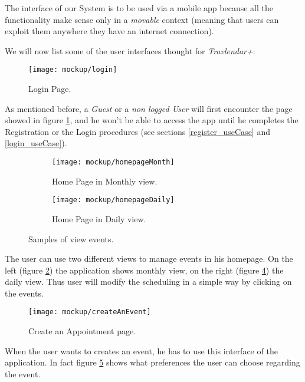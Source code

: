 The interface of our System is to be used via a mobile app because all the functionality make sense only in a \textit{movable} context (meaning that users can exploit them anywhere they have an internet connection).

We will now list some of the user interfaces thought for \textit{Travlendar+}:

\begin{figure}[h]
	\texttt{[image: mockup/login]}
	\centering
	\caption{Login Page.}
	\label{fig:login}
\end{figure}
As mentioned before, a \textit{Guest} or a \textit{non logged User} will first encounter the page showed in figure \ref{fig:login}, and he won't be able to access the app until he completes the Registration or the Login procedures (see sections \ref{register_useCase} and \ref{login_useCase}).

\begin{figure}[H]
	\begin{subfigure}{0.5\textwidth}
		\texttt{[image: mockup/homepageMonth]} 
		\centering
		\caption{Home Page in Monthly view.}
		\label{fig:homePage_Month}
	\end{subfigure}
	\begin{subfigure}{0.5\textwidth}
		\texttt{[image: mockup/homepageDaily]} 
		\centering
		\caption{Home Page in Daily view.}
		\label{fig:homePage_Day}
	\end{subfigure}
	\caption{Samples of view events.}
\end{figure}

The user can use two different views to manage events in his homepage. On the left (figure \ref{fig:homePage_Month}) the application shows monthly view, on the right (figure \ref{fig:homePage_Day}) the daily view. Thus user will modify the scheduling in a simple way by clicking on the events.

\begin{figure}[H]
	\texttt{[image: mockup/createAnEvent]}
	\centering
	\caption{Create an Appointment page.}
	\label{fig:createEvent}
\end{figure}
When the user wants to creates an event, he has to use this interface of the application. In fact figure \ref{fig:createEvent} shows what preferences the user can choose regarding the event.


